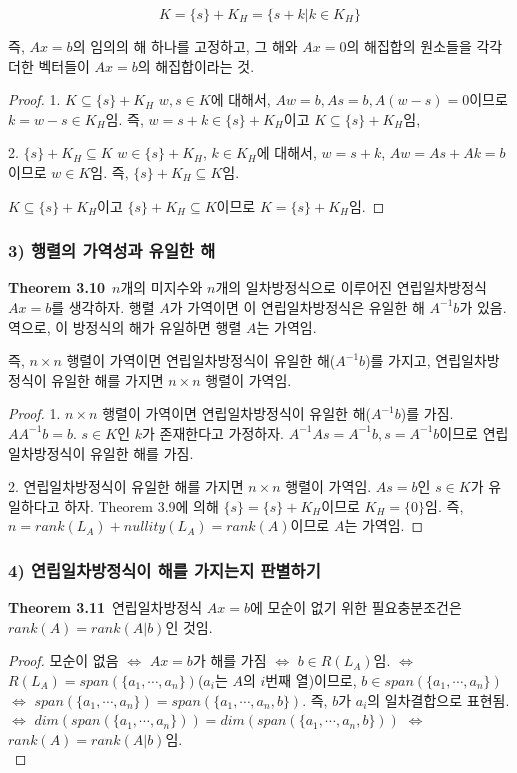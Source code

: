 \[
K=\{s\}+K_H=\{s+k | k \in K_H\}
\]

즉, $Ax=b$의 임의의 해 하나를 고정하고, 그 해와 $Ax=0$의 해집합의 원소들을 각각 더한 벡터들이 $Ax=b$의 해집합이라는 것.

\begin{proof}
1. $K \subseteq \{s\}+K_H$
$w,s \in K$에 대해서, $Aw=b,As=b,A(w-s)=0$이므로 $k=w-s \in K_H$임. 즉, $w=s+k \in \{s\}+K_H$이고 $K \subseteq \{s\}+K_H$임,

2. $\{s\}+K_H \subseteq K$
$w \in \{s\}+K_H$, $k \in K_H$에 대해서, $w=s+k$, $Aw=As+Ak=b$이므로 $w \in K$임. 즉, $\{s\}+K_H \subseteq K$임.

$K \subseteq \{s\}+K_H$이고 $\{s\}+K_H \subseteq K$이므로  $K=\{s\}+K_H$임.
\end{proof}

\subsubsection*{3) 행렬의 가역성과 유일한 해}
\textbf{Theorem 3.10}\, $n$개의 미지수와 $n$개의 일차방정식으로 이루어진 연립일차방정식 $Ax=b$를 생각하자. 행렬 $A$가 가역이면 이 연립일차방정식은 유일한 해 $A^{-1}b$가 있음. 역으로, 이 방정식의 해가 유일하면 행렬 $A$는 가역임.

즉, $n \times n$ 행렬이 가역이면 연립일차방정식이 유일한 해($A^{-1}b$)를 가지고, 연립일차방정식이 유일한 해를 가지면 $n \times n$ 행렬이 가역임.

\begin{proof}
1. $n \times n$ 행렬이 가역이면 연립일차방정식이 유일한 해($A^{-1}b$)를 가짐.
$AA^{-1}b=b$. $s \in K$인 $k$가 존재한다고 가정하자. $A^{-1}As=A^{-1}b,s=A^{-1}b$이므로 연립일차방정식이 유일한 해를 가짐.

2. 연립일차방정식이 유일한 해를 가지면 $n \times n$ 행렬이 가역임.
$As=b$인 $s \in K$가 유일하다고 하자. Theorem 3.9에 의해 $\{s\}=\{s\}+K_H$이므로 $K_H=\{0\}$임. 즉, $n=rank(L_A)+nullity(L_A)=rank(A)$이므로 $A$는 가역임.
\end{proof}

\subsubsection*{4) 연립일차방정식이 해를 가지는지 판별하기}
\textbf{Theorem 3.11}\, 연립일차방정식 $Ax=b$에 모순이 없기 위한 필요충분조건은 $rank(A)=rank(A|b)$인 것임.

\begin{proof}
모순이 없음 $\Leftrightarrow$ $Ax=b$가 해를 가짐 $\Leftrightarrow$ $b \in R(L_A)$임. $\Leftrightarrow$ $R(L_A)=span(\{a_1, \cdots ,a_n\})$($a_i$는 $A$의 $i$번째 열)이므로, $b \in span(\{a_1, \cdots ,a_n\})$ $\Leftrightarrow$ $span(\{a_1, \cdots ,a_n\})=span(\{a_1, \cdots ,a_n,b\})$. 즉, $b$가 $a_i$의 일차결합으로 표현됨. $\Leftrightarrow$ $dim(span(\{a_1, \cdots ,a_n\}))=dim(span(\{a_1, \cdots ,a_n,b\}))$ $\Leftrightarrow$ $rank(A)=rank(A|b)$임.\\
\end{proof}



